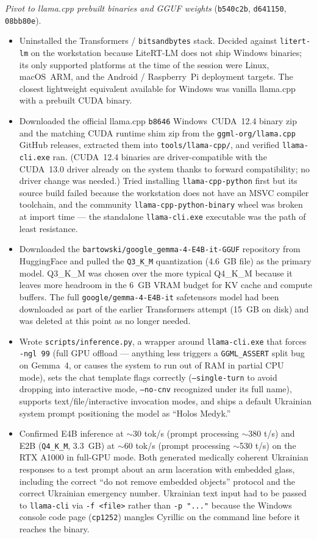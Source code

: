 \documentclass{article}
\theoremstyle{plain}
\theoremstyle{definition}
\theoremstyle{remark}
\begin{document}
\textit{Pivot to llama.cpp prebuilt binaries and GGUF weights} (\texttt{b540c2b}, \texttt{d641150}, \texttt{08bb80e}).
\begin{itemize}
\item Uninstalled the Transformers / \texttt{bitsandbytes} stack. Decided against \texttt{litert-lm} on the workstation because LiteRT-LM does not ship Windows binaries; its only supported platforms at the time of the session were Linux, macOS~ARM, and the Android / Raspberry~Pi deployment targets. The closest lightweight equivalent available for Windows was vanilla llama.cpp with a prebuilt CUDA binary.
\item Downloaded the official llama.cpp \texttt{b8646} Windows~CUDA~12.4 binary zip and the matching CUDA runtime shim zip from the \texttt{ggml-org/llama.cpp} GitHub releases, extracted them into \texttt{tools/llama-cpp/}, and verified \texttt{llama-cli.exe} ran. (CUDA~12.4 binaries are driver-compatible with the CUDA~13.0 driver already on the system thanks to forward compatibility; no driver change was needed.) Tried installing \texttt{llama-cpp-python} first but its source build failed because the workstation does not have an MSVC compiler toolchain, and the community \texttt{llama-cpp-python-binary} wheel was broken at import time --- the standalone \texttt{llama-cli.exe} executable was the path of least resistance.
\item Downloaded the \texttt{bartowski/google\_gemma-4-E4B-it-GGUF} repository from HuggingFace and pulled the \texttt{Q3\_K\_M} quantization (4.6~GB file) as the primary model. Q3\_K\_M was chosen over the more typical Q4\_K\_M because it leaves more headroom in the 6~GB VRAM budget for KV cache and compute buffers. The full \texttt{google/gemma-4-E4B-it} safetensors model had been downloaded as part of the earlier Transformers attempt (15~GB on disk) and was deleted at this point as no longer needed.
\item Wrote \texttt{scripts/inference.py}, a wrapper around \texttt{llama-cli.exe} that forces \texttt{-ngl 99} (full GPU offload --- anything less triggers a \texttt{GGML\_ASSERT} split bug on Gemma~4, or causes the system to run out of RAM in partial CPU mode), sets the chat template flags correctly (\texttt{--single-turn} to avoid dropping into interactive mode, \texttt{--no-cnv} recognized under its full name), supports text/file/interactive invocation modes, and ships a default Ukrainian system prompt positioning the model as ``Holos Medyk.''
\item Confirmed E4B inference at $\sim$30 tok/s (prompt processing $\sim$380 t/s) and E2B (\texttt{Q4\_K\_M}, 3.3~GB) at $\sim$60 tok/s (prompt processing $\sim$530 t/s) on the RTX A1000 in full-GPU mode. Both generated medically coherent Ukrainian responses to a test prompt about an arm laceration with embedded glass, including the correct ``do not remove embedded objects'' protocol and the correct Ukrainian emergency number. Ukrainian text input had to be passed to \texttt{llama-cli} via \texttt{-f <file>} rather than \texttt{-p "..."} because the Windows console code page (\texttt{cp1252}) mangles Cyrillic on the command line before it reaches the binary.

\end{itemize}
\end{document}

